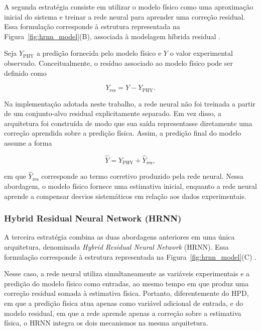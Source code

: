 A segunda estratégia consiste em utilizar o modelo físico como uma aproximação inicial do sistema e treinar a rede neural para aprender uma correção residual. Essa formulação corresponde à estrutura representada na Figura~\ref{fig:hrnn_model}(B), associada à modelagem híbrida residual \cite{zhou2025physics}.

Seja \(Y_{\text{PHY}}\) a predição fornecida pelo modelo físico e \(Y\) o valor experimental observado. Conceitualmente, o resíduo associado ao modelo físico pode ser definido como

\begin{equation}
Y_{\text{res}} = Y - Y_{\text{PHY}}.
\end{equation}

Na implementação adotada neste trabalho, a rede neural não foi treinada a partir de um conjunto-alvo residual explicitamente separado. Em vez disso, a arquitetura foi construída de modo que sua saída representasse diretamente uma correção aprendida sobre a predição física. Assim, a predição final do modelo assume a forma

\begin{equation}
\hat{Y} = Y_{\text{PHY}} + \hat{Y}_{\text{res}},
\end{equation}

\noindent em que \(\hat{Y}_{\text{res}}\) corresponde ao termo corretivo produzido pela rede neural. Nessa abordagem, o modelo físico fornece uma estimativa inicial, enquanto a rede neural aprende a compensar desvios sistemáticos em relação aos dados experimentais.

\subsubsection{Hybrid Residual Neural Network (HRNN)}

A terceira estratégia combina as duas abordagens anteriores em uma única arquitetura, denominada \textit{Hybrid Residual Neural Network} (HRNN). Essa formulação corresponde à estrutura representada na Figura~\ref{fig:hrnn_model}(C) \cite{zhou2025physics}.

Nesse caso, a rede neural utiliza simultaneamente as variáveis experimentais e a predição do modelo físico como entradas, ao mesmo tempo em que produz uma correção residual somada à estimativa física. Portanto, diferentemente do HPD, em que a predição física atua apenas como variável adicional de entrada, e do modelo residual, em que a rede aprende apenas a correção sobre a estimativa física, o HRNN integra os dois mecanismos na mesma arquitetura.

